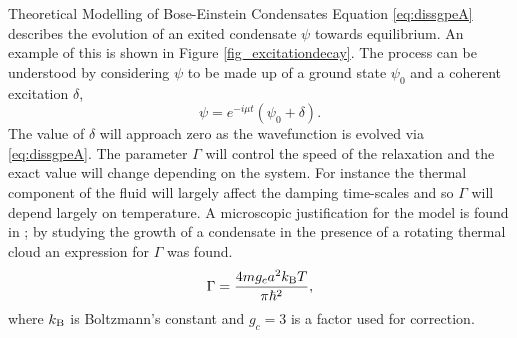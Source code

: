 \begin{chapter}{\label{cha:theoretical_model}Theoretical Modelling of Bose-Einstein Condensates}
	Equation \ref{eq:dissgpeA} describes the evolution of an exited condensate $\psi$ towards equilibrium. An example of this is shown in Figure \ref{fig_excitationdecay}. The process can be understood by considering $\psi$ to be made up of a ground state $\psi_0$ and a coherent excitation $\delta$,
	\begin{equation*}\label{eq:dissantiherm2}
		\psi = e^{-i \mu t}(\psi_0 + \delta).
	\end{equation*}
	The value of $\delta$ will approach zero as the wavefunction is evolved via \ref{eq:dissgpeA}. The parameter $\Gamma$ will control the speed of the relaxation and the exact value will change depending on the system. For instance the thermal component of the fluid will largely affect the damping time-scales and so $\Gamma$ will depend largely on temperature. A microscopic justification for the model is found in \cite{penckwitt_2002, gardiner97}; by studying the growth of a condensate in the presence of a rotating thermal cloud an expression for $\Gamma$ was found.
		\begin{equation}\label{eq:dissgamma}
		\Gamma = \frac{4mg_ca^2k_{\rm B}T}{\pi\hbar^2},
		\end{equation}
	where $k_{\rm B}$ is Boltzmann's constant and $g_c = 3$ is a factor used for correction.
\begin{figure}[!ht]
	\centering
  \hspace{-0.039\linewidth}
  \begin{tikzpicture}

\end{tikzpicture}
\end{figure}
\end{chapter}
